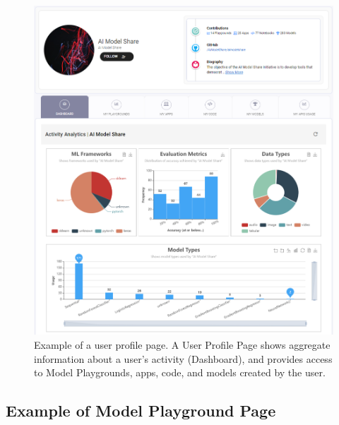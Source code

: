 \begin{figure}[h!]
  \centering
  \includegraphics[width=1\textwidth]{figures/profile_page.png}
  \caption{Example of a user profile page. A User Profile Page shows aggregate information about a user's activity (Dashboard), and provides access to Model Playgrounds, apps, code, and models created by the user.}
\end{figure}

\newpage
\subsection{Example of Model Playground Page}
\label{app:playground}

